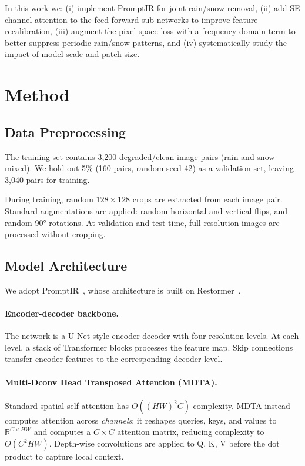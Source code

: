 \documentclass[runningheads]{llncs}
\begin{document}
In this work we: (i) implement PromptIR for joint rain/snow removal,
(ii) add SE channel attention to the feed-forward sub-networks to improve
feature recalibration, (iii) augment the pixel-space loss with a
frequency-domain term to better suppress periodic rain/snow patterns, and
(iv) systematically study the impact of model scale and patch size.

\section{Method}

\subsection{Data Preprocessing}

The training set contains 3,200 degraded/clean image pairs (rain and snow
mixed). We hold out 5\% (160 pairs, random seed 42) as a validation set,
leaving 3,040 pairs for training.

During training, random $128\!\times\!128$ crops are extracted from each
image pair. Standard augmentations are applied: random horizontal and
vertical flips, and random 90° rotations. At validation and test time,
full-resolution images are processed without cropping.

\subsection{Model Architecture}

We adopt PromptIR~\cite{potlapalli2023promptir}, whose architecture is built
on Restormer~\cite{zamir2022restormer}.

\paragraph{Encoder-decoder backbone.}
The network is a U-Net-style encoder-decoder with four resolution levels.
At each level, a stack of Transformer blocks processes the feature map.
Skip connections transfer encoder features to the corresponding decoder level.

\paragraph{Multi-Dconv Head Transposed Attention (MDTA).}
Standard spatial self-attention has $O((HW)^2 C)$ complexity.
MDTA instead computes attention across \emph{channels}: it reshapes queries,
keys, and values to $\mathbb{R}^{C \times HW}$ and computes a $C\!\times\!C$
attention matrix, reducing complexity to $O(C^2 HW)$. Depth-wise convolutions
are applied to Q, K, V before the dot product to capture local context.
\end{document}
